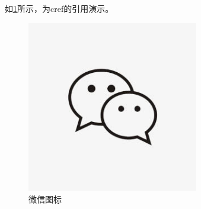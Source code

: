 \documentclass{thesis_demo}
\begin{document}
	如\cref{fig:wechat}所示，为cref的引用演示。
	\begin{figure}[!htbp]
		\centering
		\includegraphics[width=7.5cm]{wechat.jpg}
		\caption{微信图标}
		\label{fig:wechat}
	\end{figure} 
\end{document}
